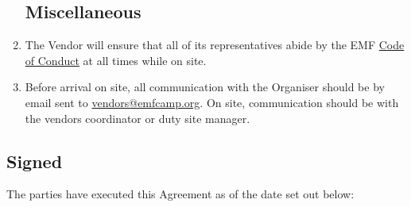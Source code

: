 \begin{enumerate}
\subsection*{Miscellaneous}
\item The Vendor will ensure that all of its representatives abide by the EMF
        \href{https://www.emfcamp.org/code-of-conduct}{Code of Conduct} at all times while on site.
\item Before arrival on site, all communication with the Organiser should be by email sent to
        \href{mailto:vendors@emfcamp.org}{vendors@emfcamp.org}. On site, communication should be
        with the vendors coordinator or duty site manager.

\end{enumerate}

\newpage

\subsection*{Signed}
The parties have executed this Agreement as of the date set out below:




